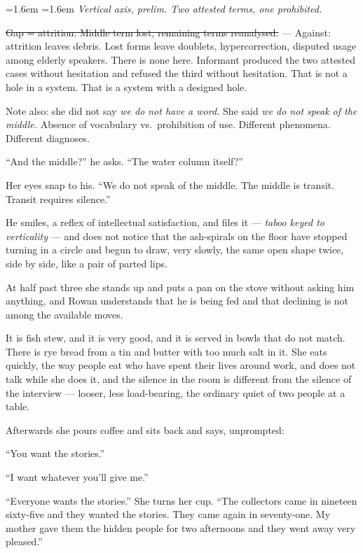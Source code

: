 \documentclass[11pt,oneside]{book}
\newcommand{\sceneline}{%
  \par\vspace{1.2em}
  \begin{center}
    \fontsize{11}{11}\selectfont \textbullet\quad\textbullet\quad\textbullet
  \end{center}
  \vspace{0.6em}\noindent\ignorespaces
}
\newenvironment{fieldnote}
  {\par\vspace{0.9em}\begingroup
   \leftskip=1.6em \rightskip=1.6em
   \fontsize{10}{12.4}\selectfont\itshape
   \setlength{\parindent}{0pt}\noindent\ignorespaces}
  {\par\endgroup\vspace{0.9em}\noindent\ignorespaces}
\newcommand{\struck}[1]{\sout{#1}}
\begin{document}
\begin{fieldnote}
Vertical axis, prelim. Two attested terms, one prohibited.

\struck{Gap = attrition. Middle term lost, remaining terms reanalysed.}
--- Against: attrition leaves debris. Lost forms leave doublets,
hypercorrection, disputed usage among elderly speakers. There is none
here. Informant produced the two attested cases without hesitation and
refused the third without hesitation. That is not a hole in a system.
That is a system with a designed hole.

Note also: she did not say \emph{we do not have a word.} She said
\emph{we do not speak of the middle.} Absence of vocabulary vs.\
prohibition of use. Different phenomena. Different diagnoses.
\end{fieldnote}

``And the middle?'' he asks. ``The water column itself?''

Her eyes snap to his. ``We do not speak of the middle. The middle is
transit. Transit requires silence.''

He smiles, a reflex of intellectual satisfaction, and files it ---
\emph{taboo keyed to verticality} --- and does not notice that the
ash-spirals on the floor have stopped turning in a circle and begun to
draw, very slowly, the same open shape twice, side by side, like a pair
of parted lips.

\sceneline

At half past three she stands up and puts a pan on the stove without
asking him anything, and Rowan understands that he is being fed and that
declining is not among the available moves.

It is fish stew, and it is very good, and it is served in bowls that do
not match. There is rye bread from a tin and butter with too much salt
in it. She eats quickly, the way people eat who have spent their lives
around work, and does not talk while she does it, and the silence in the
room is different from the silence of the interview --- looser, less
load-bearing, the ordinary quiet of two people at a table.

Afterwards she pours coffee and sits back and says, unprompted:

``You want the stories.''

``I want whatever you'll give me.''

``Everyone wants the stories.'' She turns her cup. ``The collectors came
in nineteen sixty-five and they wanted the stories. They came again in
seventy-one. My mother gave them the hidden people for two afternoons
and they went away very pleased.''
\end{document}
